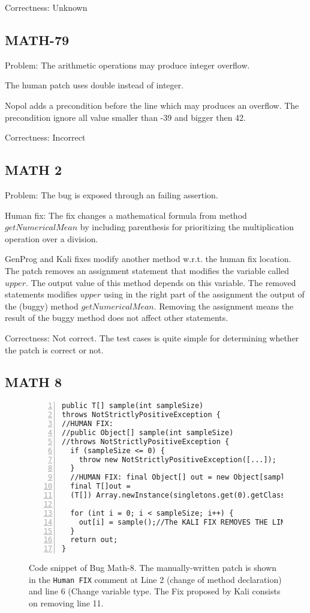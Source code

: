 \documentclass{article}
\newcommand{\mycode}[1]{{\small \texttt{#1}}\xspace}
\begin{document}
Correctness: Unknown

\subsection{MATH-79}
Problem: The arithmetic operations may produce integer overflow.

The human patch uses double instead of integer.

Nopol adds a precondition before the line which may produces an overflow. The precondition ignore all value smaller than -39 and bigger then 42.

Correctness: Incorrect

\subsection{MATH 2}

Problem:
The bug is exposed through an failing assertion.

Human fix:
The fix changes a mathematical formula from method $getNumericalMean$ by including parenthesis for prioritizing the multiplication operation over a division.

GenProg and Kali fixes modify another method w.r.t. the human fix location.
The patch removes an assignment statement that modifies the variable called $upper$. 
The output value of this method depends on this variable.
The removed statements modifies $upper$ using in the right part of the assignment the output of the (buggy) method $getNumericalMean$.
Removing the assignment means the result of the buggy method does not affect other statements.

Correctness: Not correct.
The test cases is quite simple for determining whether the patch is correct or not.

\subsection{MATH 8} 


\begin{figure}[!t]
\centering
\noindent\begin{minipage}{0.4\textwidth}
\begin{lstlisting}[numbers=left]
public T[] sample(int sampleSize) 
throws NotStrictlyPositiveException {
//HUMAN FIX: 
//public Object[] sample(int sampleSize) 
//throws NotStrictlyPositiveException { 
  if (sampleSize <= 0) {
    throw new NotStrictlyPositiveException([...]);
  }
  //HUMAN FIX: final Object[] out = new Object[sampleSize];
  final T[]out = 
  (T[]) Array.newInstance(singletons.get(0).getClass(), sampleSize);

  for (int i = 0; i < sampleSize; i++) {
    out[i] = sample();//The KALI FIX REMOVES THE LINE
  }
  return out;
}
\end{lstlisting}

\end{minipage}
\caption{Code snippet of Bug Math-8. The manually-written patch is shown in the \mycode{Human FIX} comment at Line 2 (change of method declaration) and line 6 (Change variable type. The Fix proposed by Kali consists on removing line 11. }
\end{figure}    
    
\end{document}
